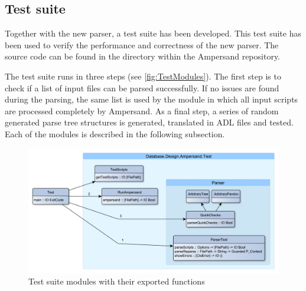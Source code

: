 
\subsection{Test suite}
  Together with the new parser, a test suite has been developed.
  This test suite has been used to verify the performance and correctness of the new parser.
  The source code can be found in the directory  within the Ampersand repository.

  The test suite runs in three steps (see \autoref{fig:TestModules}).
  The first step is to check if a list of input files can be parsed successfully. 
  If no issues are found during the parsing, the same list is used by the module  in which all input scripts are processed completely by Ampersand.
  As a final step, a series of random generated parse tree structures is generated, translated in ADL files and tested.
  Each of the modules is described in the following subsection.
  \begin{figure}[ht]%
    \includegraphics[width=\columnwidth]{Figures/TestModules}
    \caption{Test suite modules with their exported functions}
    \label{fig:TestModules}
  \end{figure}%

